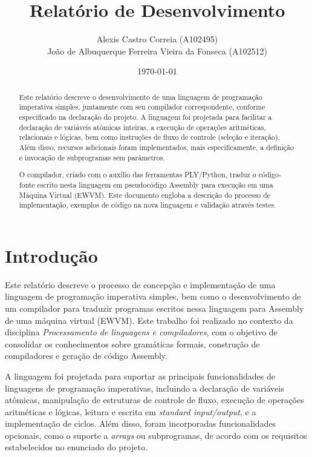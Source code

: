 \documentclass[12pt,a4paper]{report}
\title{Relatório de Desenvolvimento}
\author{Alexis Castro Correia (A102495) \\ João de Albuquerque Ferreira Vieira da Fonseca (A102512)}
\date{\today}
\begin{document}
\maketitle
\begin{abstract}

Este relatório descreve o desenvolvimento de uma linguagem de programação imperativa simples, juntamente com seu compilador correspondente, conforme especificado na declaração do projeto. A linguagem foi projetada para facilitar a declaração de variáveis atômicas inteiras, a execução de operações aritméticas, relacionais e lógicas, bem como instruções de fluxo de controle (seleção e iteração). Além disso, recursos adicionais foram implementados, mais especificamente, a definição e invocação de subprogramas sem parâmetros.

O compilador, criado com o auxílio das ferramentas PLY/Python, traduz o código-fonte escrito nesta linguagem em pseudocódigo Assembly para execução em uma Máquina Virtual (EWVM). Este documento engloba a descrição do processo de implementação, exemplos de código na nova linguagem e validação através testes.
\end{abstract}

\tableofcontents %
\chapter{Introdu\c{c}\~{a}o}

Este relatório descreve o processo de concepção e implementação de uma linguagem de programação imperativa simples, bem como o desenvolvimento de um compilador para traduzir programas escritos nessa linguagem para Assembly de uma máquina virtual (EWVM). Este trabalho foi realizado no contexto da disciplina \emph{Processamento de linguagens e compiladores}, com o objetivo de consolidar os conhecimentos sobre gramáticas formais, construção de compiladores e geração de código Assembly.

A linguagem foi projetada para suportar as principais funcionalidades de linguagens de programação imperativas, incluindo a declaração de variáveis atômicas, manipulação de estruturas de controle de fluxo, execução de operações aritméticas e lógicas, leitura e escrita em \emph{standard input/output}, e a implementação de ciclos. Além disso, foram incorporadas funcionalidades opcionais, como o suporte a \emph{arrays} ou subprogramas, de acordo com os requisitos estabelecidos no enunciado do projeto.
\end{document}
